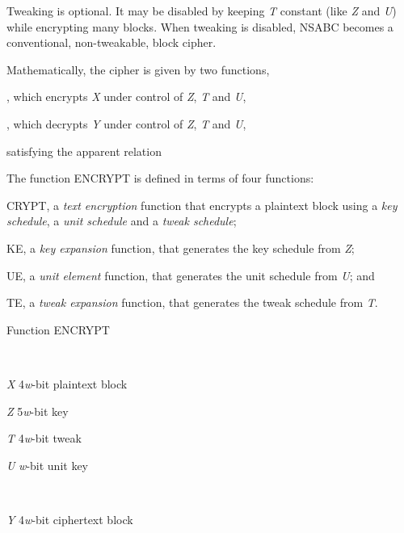 \documentclass[a4paper,oneside,english]{amsart}
\numberwithin{equation}{section}
\numberwithin{figure}{section}
\newenvironment{lyxlist}[1]
{\begin{list}{}
{\settowidth{\labelwidth}{#1}
 \setlength{\leftmargin}{\labelwidth}
 \addtolength{\leftmargin}{\labelsep}
 \renewcommand{\makelabel}[1]{##1\hfil}}}
{\end{list}}
\begin{document}
Tweaking is optional. It may be disabled by keeping \emph{T} constant
(like \emph{Z} and \emph{U}) while encrypting many blocks. When tweaking
is disabled, NSABC becomes a conventional, non-tweakable, block cipher.

Mathematically, the cipher is given by two functions,
\begin{lyxlist}{00.00.0000}
\item [{,}] which encrypts \emph{X} under control
of \emph{Z}, \emph{T} and \emph{U},
\item [{,}] which decrypts \emph{Y} under control
of \emph{Z}, \emph{T} and \emph{U},
\end{lyxlist}
satisfying the apparent relation




The function ENCRYPT is defined in terms of four functions:
\begin{lyxlist}{00.00.0000}
\item [{CRYPT,}] a \emph{text encryption} function that encrypts a plaintext
block using a \emph{key schedule}, a \emph{unit schedule} and a \emph{tweak
schedule}; 
\item [{KE,}] a \emph{key expansion} function, that generates the key schedule
from \emph{Z};
\item [{UE,}] a \emph{unit element} function, that generates the unit schedule
from \emph{U}; and
\item [{TE,}] a \emph{tweak expansion} function, that generates the tweak
schedule from \emph{T}.
\end{lyxlist}
\begin{algorithm}[h]
\caption{\label{alg:Function-ENCRYPT}Function ENCRYPT}

\begin{description}
\item [{Input}]~

\begin{lyxlist}{00.00.0000}
\item [{\emph{X}}] 4\emph{w}-bit plaintext block
\item [{\emph{Z}}] 5\emph{w}-bit key
\item [{\emph{T}}] 4\emph{w}-bit tweak
\item [{\emph{U}}] \emph{w}-bit unit key
\end{lyxlist}
\item [{Output}]~

\begin{lyxlist}{00.00.0000}
\item [{\emph{Y}}] 4\emph{w}-bit ciphertext block
\end{lyxlist}
\item [{Relation}]~


\end{description}
\end{algorithm}
\end{document}
